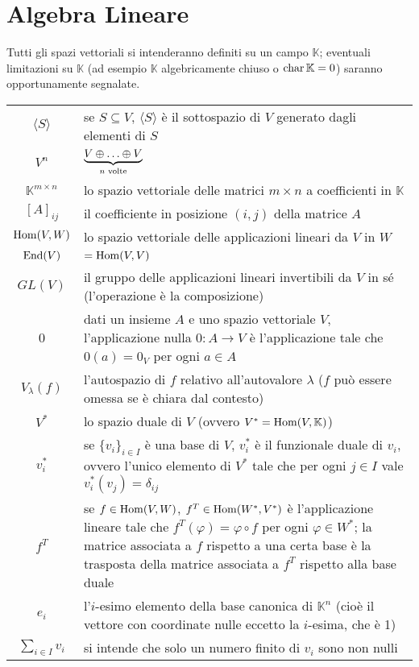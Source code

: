 \section{Algebra Lineare}
Tutti gli spazi vettoriali si intenderanno definiti su un campo $\mathbb{K}$; eventuali limitazioni su $\mathbb{K}$ (ad esempio $\mathbb{K}$ algebricamente chiuso o $\operatorname{char}\mathbb{K}=0$) saranno opportunamente segnalate.\\
\begin{tabularx}{\textwidth}{SX}
\hline
$\langle S\rangle$ & se $S\subseteq V$, $\langle S\rangle$ è il sottospazio di $V$ generato dagli elementi di $S$ \\
$V^n$ & $\underbrace{V\oplus\ldots\oplus V}_\text{$n$ volte}$\\
$\mathbb{K}^{m\times n}$ & lo spazio vettoriale delle matrici $m\times n$ a coefficienti in $\mathbb{K}$\\
$[A]_{ij}$ & il coefficiente in posizione $(i,j)$ della matrice $A$\\
$\operatorname{Hom}(V,W)$ & lo spazio vettoriale delle applicazioni lineari da $V$ in $W$\\
$\operatorname{End}(V)$ & $=\operatorname{Hom}(V,V)$ \\
$GL(V)$ & il gruppo delle applicazioni lineari invertibili da $V$ in sé (l'operazione è la composizione) \\
0 & dati un insieme $A$ e uno spazio vettoriale $V$, l'applicazione nulla $0:A\to V$ è l'applicazione tale che $0(a)=0_V$ per ogni $a\in A$ \\
$V_\lambda(f)$ & l'autospazio di $f$ relativo all'autovalore $\lambda$ ($f$ può essere omessa se è chiara dal contesto)\\
$V^*$ & lo spazio duale di $V$ (ovvero $V^*=\operatorname{Hom}(V,\mathbb{K})$) \\
$v_i^*$ & se $\{v_i\}_{i\in I}$ è una base di $V$, $v_i^*$ è il funzionale duale di $v_i$, ovvero l'unico elemento di $V^*$ tale che per ogni $j\in I$ vale $v_i^*(v_{j})=\delta_{ij}$\\
$f^T$ & se $f\in\operatorname{Hom}(V,W)$, $f^T\in\operatorname{Hom}(W^*,V^*)$ è l'applicazione lineare tale che $f^T(\varphi)=\varphi\circ f$ per ogni $\varphi\in W^*$; la matrice associata a $f$ rispetto a una certa base è la trasposta della matrice associata a $f^T$ rispetto alla base duale\\
$e_i$ & l'$i$-esimo elemento della base canonica di $\mathbb{K}^n$ (cioè il vettore con coordinate nulle eccetto la $i$-esima, che è 1)\\
$\sum_{i\in I}v_i$ & si intende che solo un numero finito di $v_i$ sono non nulli\\
\hline
\end{tabularx}


